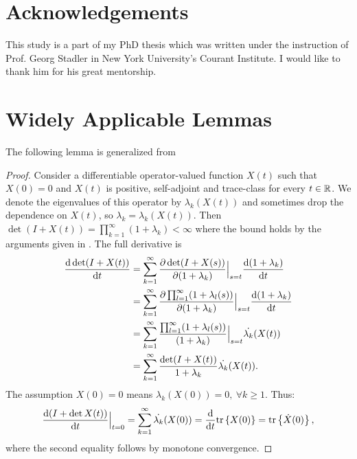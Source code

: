 \documentclass{amsart}
\numberwithin{equation}{section}
\begin{document}
\section{Acknowledgements}
This study is a part of my PhD thesis \cite{mine} which was written
under the instruction of Prof. Georg Stadler in New York University's
Courant Institute. I would like to thank him for his great mentorship.

\appendix
\section{Widely Applicable Lemmas}

The following lemma is generalized from \cite[Chapter 9,
  Theorem 4, pp. 127]{Lax97}
\lax
\begin{proof}
  Consider a differentiable operator-valued function $X(t)$ such that
  $X(0) = 0$ and $X(t)$ is positive, self-adjoint and trace-class for
  every $t\in \mathbb{R}$. We denote the eigenvalues of this operator by
  $\lambda_k(X(t))$ and sometimes drop the dependence on $X(t)$, so
  $\lambda_k = \lambda_k(X(t))$.  Then $\det (I+X(t)) =
  \prod_{k=1}^{\infty} (1+\lambda_k) < \infty$ where the bound holds
  by the arguments given in \cite{AlexanderianGloorGhattas14}. The
  full derivative is
  \begin{align*}
    \frac{\text{\textup{d}} \det (I+X(t))}{\text{\textup{d}} t} 
    &= \sum_{k=1}^{\infty} 
    \frac{\partial \det (I+X(s))}{\partial (1+\lambda_k)}\Big |_{s=t}
    \frac{\text{\textup{d}} (1+\lambda_k)}{\text{\textup{d}} t} \\
    &= \sum_{k=1}^{\infty} \frac{\partial \prod_{l=1}^{\infty}
      (1+\lambda_l(s))}{\partial (1+\lambda_k)}\Big |_{s=t}
    \frac{\text{\textup{d}} (1+\lambda_k)}{\text{\textup{d}} t} \\
    &= \sum_{k=1}^{\infty} \frac{\prod_{l=1}^{\infty}
      (1+\lambda_l(s))}{(1+\lambda_k)}\Big |_{s=t}
    \dot{\lambda_k}(X(t)) \\
    &= \sum_{k=1}^{\infty} \frac{\det (I+X(t))}{1 +\lambda_k} \dot{\lambda_k}(X(t)).
  \end{align*}
  The assumption $X(0) = 0$ means $\lambda_k(X(0)) = 0,\ \forall k \geq 1$. Thus:
  \begin{align*}
    \frac{\text{\textup{d}} (I+\det X(t))}{\text{\textup{d}} t}\Big |_{t=0} 
    = \sum_{k=1}^{\infty} \dot{\lambda_k}(X(0)) 
    = \frac{\text{\textup{d}} }{\text{\textup{d}} t}\textup{tr}\left \{X(0) \right \}
    = \textup{tr}\left \{\dot{X}(0) \right \},
  \end{align*}
  where the second equality follows by monotone convergence. 

\end{proof}
\end{document}
